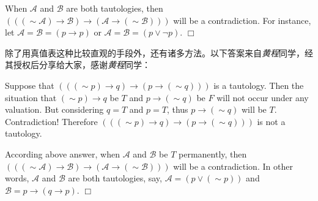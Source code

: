 \documentclass[UTF8,12pt,a4paper]{ctexart}
\newcommand{\negs}{\sim\!}
\begin{document}
When  $\mathscr{A}$ and $\mathscr{B}$  are both tautologies, 
then $(((\negs \mathscr{A}) \to \mathscr{B})  \to (\mathscr{A} \to (\negs \mathscr{B})))$ will be a contradiction. 
For instance, let $\mathscr{A} = \mathscr{B} = (p \to p)$ or 
$\mathscr{A} = \mathscr{B} = (p \lor  \neg p)$.
\hfill $\Box$


\vspace{1em}
除了用真值表这种比较直观的手段外，还有诸多方法。以下答案来自\textit{黄程}同学，经其授权后分享给大家，感谢\textit{黄程}同学\faThumbsUp ：

Suppose that $(((\negs p) \to q)  \to (p \to (\negs q)))$  is a tautology. Then the situation that $(\negs p) \to q $ be $T$ and $p \to (\negs q)$ be $F$ will not occur under any valuation. 
But considering $q = T$ and $p = T$,  thus $p \to (\negs q)$ will be $T$. Contradiction! 
Therefore $(((\negs p) \to q)  \to (p \to (\negs q)))$  is not a tautology.

According above answer, when $\mathscr{A}$ and $\mathscr{B}$ be $T$ permanently, then $(((\negs \mathscr{A}) \to \mathscr{B})  \to (\mathscr{A} \to (\negs \mathscr{B})))$ will be a contradiction.
In other words, $\mathscr{A}$ and $\mathscr{B}$ are both tautologies, say, 
$\mathscr{A} = (p \lor  (\negs p))$ and $\mathscr{B} = p \to (q \to p)$.
\hfill $\Box$
\end{document}
